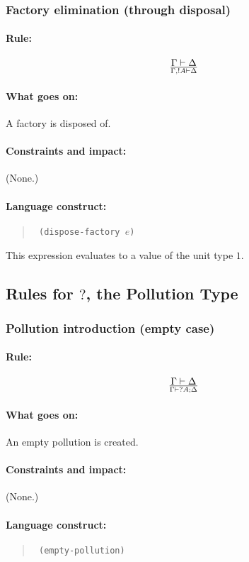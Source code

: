 \documentclass[a4paper]{article}
\begin{document}
\subsubsection{Factory elimination (through disposal)}
\paragraph{Rule:}
$$
{
  \Gamma \vdash \Delta
}\over{
  \Gamma, !A \vdash \Delta
}
$$
\paragraph{What goes on:} A factory is disposed of.
\paragraph{Constraints and impact:} (None.)
\paragraph{Language construct:}
\begin{quote}\tt
  (dispose-factory $e$)
\end{quote}
This expression evaluates to a value of the unit type $1$.

\subsection{Rules for $?$, the Pollution Type}

\subsubsection{Pollution introduction (empty case)}
\paragraph{Rule:}
$$
{
  \Gamma \vdash \Delta
}\over{
  \Gamma \vdash ?A;\Delta
}
$$
\paragraph{What goes on:} An empty pollution is created.
\paragraph{Constraints and impact:} (None.)
\paragraph{Language construct:}
\begin{quote}\tt
  (empty-pollution)
\end{quote}
\end{document}
